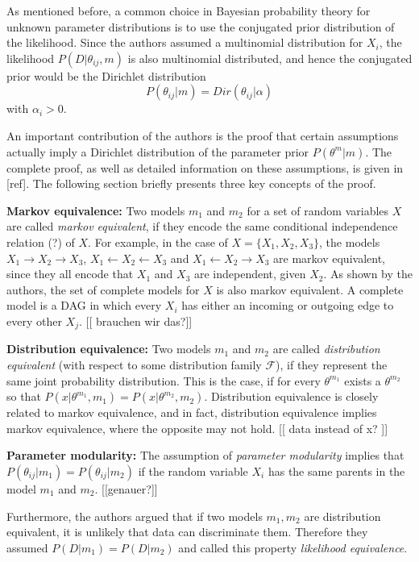 \documentclass{article}
\begin{document}
	As mentioned before, a common choice in Bayesian probability theory for unknown parameter distributions
	is to use the conjugated prior distribution of the likelihood.
	Since the authors assumed a multinomial distribution
	for $X_i$, the likelihood $P(D|\theta_{ij},m)$ is also multinomial distributed, and hence the
	conjugated prior would be the Dirichlet distribution
	\[
		P(\theta_{ij}|m) = Dir(\theta_{ij}|\alpha)
	\]
	with $\alpha_i > 0$.
	
	An important contribution of the authors is the proof that certain assumptions actually 
	imply a Dirichlet distribution of the parameter prior $P(\theta^m|m)$.
	The complete proof, as well as detailed information on these assumptions, is given in [ref].
	The following section briefly presents three key concepts of the proof.
	
	\textbf{Markov equivalence:}
	Two models $m_1$ and $m_2$ for a set of random variables $X$ are called \textit{markov equivalent},
	if they encode the same conditional independence relation (?) of $X$. For example, in the case of
	$X=\{X_1,X_2,X_3\}$, the models $X_1 \rightarrow X_2 \rightarrow X_3$,
	$X_1 \leftarrow X_2 \leftarrow X_3$ and $X_1 \leftarrow X_2 \rightarrow X_3$ are 
	markov equivalent, since they all encode that $X_1$ and $X_3$ are independent, given $X_2$.
	As shown by the authors, the set of complete models for $X$ is also markov equivalent. 
	A complete model is a DAG in which every $X_i$ has either an 	incoming or outgoing edge 
	to every other $X_j$. [[ brauchen wir das?]]
	
	\textbf{Distribution equivalence:}
	Two models $m_1$ and $m_2$ are called \textit{distribution equivalent} (with respect to some distribution
	family $\mathcal{F}$), if they represent the same
	joint probability distribution. This is the case, if for every $\theta^{m_1}$ exists a $\theta^{m_2}$
	so that $P(x|\theta^{m_1},m_1) = P(x|\theta^{m_2},m_2)$. Distribution equivalence is closely related
	to markov equivalence, and in fact, distribution equivalence implies markov equivalence, where the
	opposite may not hold. [[ data instead of x? ]]
	
	\textbf{Parameter modularity:}
	The assumption of \textit{parameter modularity} implies that $P(\theta_{ij}|m_1) = P(\theta_{ij}|m_2)$
	if the random variable $X_i$ has the same parents in the model $m_1$ and $m_2$. [[genauer?]]
	
	Furthermore, the authors argued that if two models $m_1,m_2$ are distribution equivalent,
	it is unlikely that data can	discriminate them. Therefore they assumed $P(D|m_1)=P(D|m_2)$ and called this
	property \textit{likelihood equivalence}.
	
\end{document}
